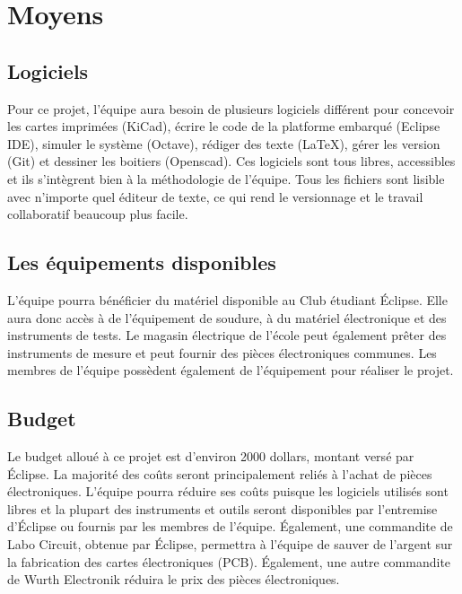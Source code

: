 \section{Moyens}

\subsection{Logiciels}
Pour ce projet, l'équipe aura besoin de plusieurs logiciels différent pour concevoir les cartes imprimées (KiCad), écrire le code de la platforme embarqué (Eclipse IDE), simuler le système (Octave), rédiger des texte (LaTeX), gérer les version (Git) et dessiner les boitiers (Openscad). Ces logiciels sont tous libres, accessibles et ils s'intègrent bien à la méthodologie de l'équipe. Tous les fichiers sont lisible avec n'importe quel éditeur de texte, ce qui rend le versionnage et le travail collaboratif beaucoup plus facile.\\

\subsection{Les équipements disponibles}
L'équipe pourra bénéficier du matériel disponible au Club étudiant Éclipse. Elle aura donc accès à de l'équipement de soudure, à du matériel électronique et des instruments de tests. Le magasin électrique de l'école peut également prêter des instruments de mesure et peut fournir des pièces électroniques communes. Les membres de l'équipe possèdent également de l'équipement pour réaliser le projet.

\subsection{Budget}
Le budget alloué à ce projet est d'environ 2000 dollars, montant versé par Éclipse. La majorité des coûts seront principalement reliés à l'achat de pièces électroniques. L'équipe pourra réduire ses coûts puisque les logiciels utilisés sont libres et la plupart des instruments et outils seront disponibles par l'entremise d'Éclipse ou fournis par les membres de l'équipe. Également, une commandite de Labo Circuit, obtenue par Éclipse, permettra à l'équipe de sauver de l'argent sur la fabrication des cartes électroniques (PCB). Également, une autre commandite de Wurth Electronik réduira le prix des pièces électroniques.

